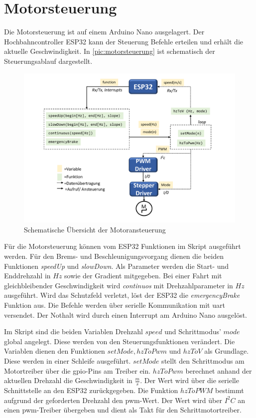 \section{Motorsteuerung}
\label{sec:motorsteuerung}
Die Motorsteuerung ist auf einem Arduino Nano ausgelagert. Der Hochbahncontroller ESP32 kann der Steuerung Befehle erteilen und erhält die aktuelle Geschwindigkeit. In \autoref{pic:motorsteuerung} ist schematisch der Steuerungsablauf  dargestellt. 

\begin{figure}[h]
	\begin{center}
		\includegraphics[width=16cm]{motorsteuerung.pdf}
		\caption{Schematische Übersicht der Motoransteuerung}
		\label{pic:motorsteuerung}
	\end{center}
\end{figure}



Für die Motorsteuerung können vom ESP32 Funktionen im Skript ausgeführt werden. Für den Brems- und Beschleunigungsvorgang dienen die beiden Funktionen \textit{ speedUp} und \textit{slowDown}. Als Parameter werden die Start- und Enddrehzahl in $Hz$ sowie der Gradient mitgegeben. Bei einer Fahrt mit gleichbleibender Geschwindigkeit wird \textit{continuos} mit Drehzahlparameter in $Hz$ ausgeführt. Wird das Schutzfeld verletzt, löst der ESP32 die \textit{emergencyBrake} Funktion aus. Die Befehle werden über serielle Kommunikation mit \acrshort{uart} versendet. Der Nothalt wird durch einen Interrupt am Arduino Nano ausgelöst. \\
\newpage

Im Skript sind die beiden Variablen Drehzahl $speed$ und Schrittmodus' $mode$ global angelegt. Diese werden von den Steuerungsfunktionen verändert. Die Variablen dienen den Funktionen $setMode, hzToPwm$ und $hzToV$ als Grundlage. Diese werden in einer Schleife ausgeführt. $setMode$ stellt den Schrittmodus am Motortreiber über die \acrshort{gpio}-Pins am  Treiber ein. $hzToPwm$ berechnet anhand der aktuellen Drehzahl die Geschwindigkeit in $\frac{m}{s}$. Der Wert wird über die serielle Schnittstelle an den ESP32 zurückgegeben. Die Funktion $hzToPWM$ bestimmt aufgrund der geforderten Drehzahl den \acrshort{pwm}-Wert. Der Wert wird über $I^2C$ an einen  \acrshort{pwm}-Treiber übergeben und dient als Takt für den Schrittmotortreiber. \\


